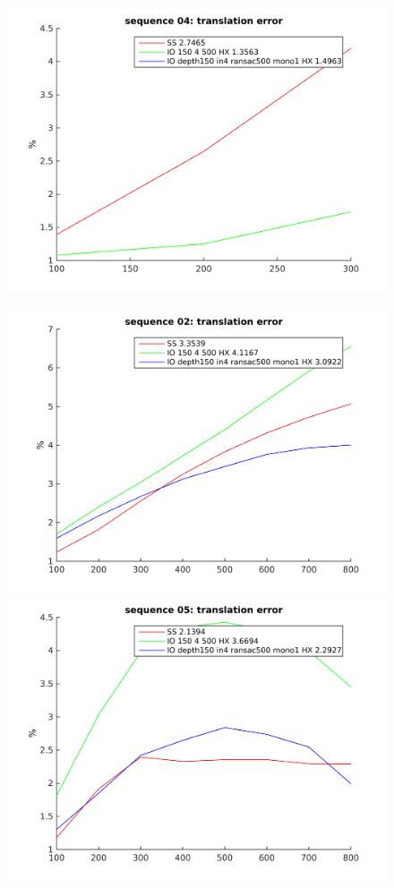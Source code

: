 \documentclass[runningheads]{llncs}
\begin{document}
\begin{figure}
\begin{minipage}[t]{.3\linewidth}
    \includegraphics[width=\textwidth]{translation_error_04}
  \end{minipage}
  \begin{minipage}[t]{.3\linewidth}
    \centering
    \includegraphics[width=\textwidth]{translation_error_02}
    \includegraphics[width=\textwidth]{translation_error_05}

\end{minipage}
\end{figure}
\end{document}
